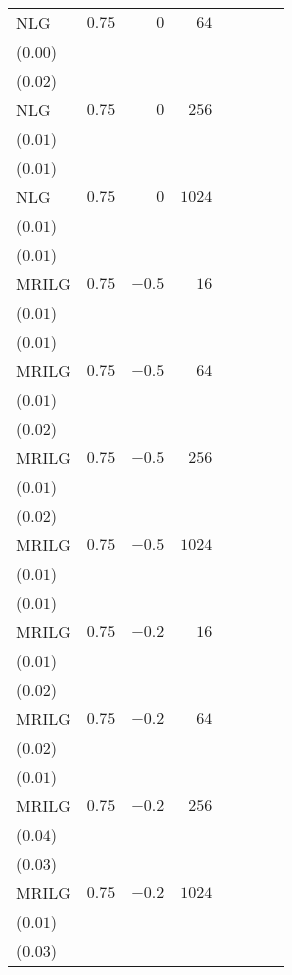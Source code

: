 \begin{table}[t]
\begin{tabular}{lrrrrrrr}
NLG & \(0.75\) & \(0\) & \(64\) & \longcell{\(0.07\)\\{\tiny(\(0.00\))}} & \longcell{\(0.03\)\\{\tiny(\(0.02\))}} \\[2.2ex]
NLG & \(0.75\) & \(0\) & \(256\) & \longcell{\(0.09\)\\{\tiny(\(0.01\))}} & \longcell{\(0.04\)\\{\tiny(\(0.01\))}} \\[2.2ex]
NLG & \(0.75\) & \(0\) & \(1024\) & \longcell{\(0.11\)\\{\tiny(\(0.01\))}} & \longcell{\(0.03\)\\{\tiny(\(0.01\))}} \\[2.2ex]
MRILG & \(0.75\) & \(-0.5\) & \(16\) & \longcell{\(0.04\)\\{\tiny(\(0.01\))}} & \longcell{\(0.02\)\\{\tiny(\(0.01\))}} \\[2.2ex]
MRILG & \(0.75\) & \(-0.5\) & \(64\) & \longcell{\(0.07\)\\{\tiny(\(0.01\))}} & \longcell{\(0.03\)\\{\tiny(\(0.02\))}} \\[2.2ex]
MRILG & \(0.75\) & \(-0.5\) & \(256\) & \longcell{\(0.10\)\\{\tiny(\(0.01\))}} & \longcell{\(0.05\)\\{\tiny(\(0.02\))}} \\[2.2ex]
MRILG & \(0.75\) & \(-0.5\) & \(1024\) & \longcell{\(0.11\)\\{\tiny(\(0.01\))}} & \longcell{\(0.03\)\\{\tiny(\(0.01\))}} \\[2.2ex]
MRILG & \(0.75\) & \(-0.2\) & \(16\) & \longcell{\(0.04\)\\{\tiny(\(0.01\))}} & \longcell{\(0.03\)\\{\tiny(\(0.02\))}} \\[2.2ex]
MRILG & \(0.75\) & \(-0.2\) & \(64\) & \longcell{\(0.06\)\\{\tiny(\(0.02\))}} & \longcell{\(0.02\)\\{\tiny(\(0.01\))}} \\[2.2ex]
MRILG & \(0.75\) & \(-0.2\) & \(256\) & \longcell{\(0.08\)\\{\tiny(\(0.04\))}} & \longcell{\(0.03\)\\{\tiny(\(0.03\))}} \\[2.2ex]
MRILG & \(0.75\) & \(-0.2\) & \(1024\) & \longcell{\(0.11\)\\{\tiny(\(0.01\))}} & \longcell{\(0.03\)\\{\tiny(\(0.03\))}} \\[2.2ex]

\end{tabular}
\end{table}
